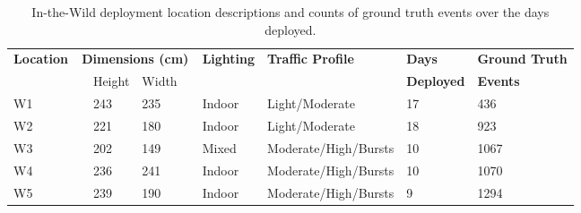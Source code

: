 \begin{table}[t]
\centering
\footnotesize
	\begin{tabular}{@{}p{1.0in}p{0.2in}llp{0.2in}p{0.6in}p{1.3in}p{0.6in}l@{}}
	\toprule
	\multirow{2}{*}{\textbf{Location}}	&	\multicolumn{4}{c}{\textbf{Dimensions (cm)}} & \multirow{2}{*}{\textbf{Lighting}} & \multirow{2}{*}{\textbf{Traffic Profile}} & \textbf{Days}& \textbf{Ground Truth}  \\
		& & Height & Width 	&  						&	&  &   \textbf{Deployed} & \textbf{Events} \\\midrule
	W1 & & 243 & 235  & & Indoor  & Light/Moderate   & 17    & 436   \\ %
	W2 & & 221 & 180 & & Indoor  & Light/Moderate    & 18   & 923  \\ %
	W3 & & 202 & 149 & & Mixed   & Moderate/High/Bursts& 10 & 1067  \\	%
    	W4 & & 236 & 241  & & Indoor  & Moderate/High/Bursts & 10& 1070 \\ %
	W5 & & 239 & 190 & & Indoor  & Moderate/High/Bursts  & 9& 1294  \\ %
	\bottomrule
	\end{tabular}
	\caption{In-the-Wild deployment location descriptions and counts of ground truth events over the days deployed.
	\vspace{1mm}
	\label{tab:ITWcategoryfreq}}

\end{table}

